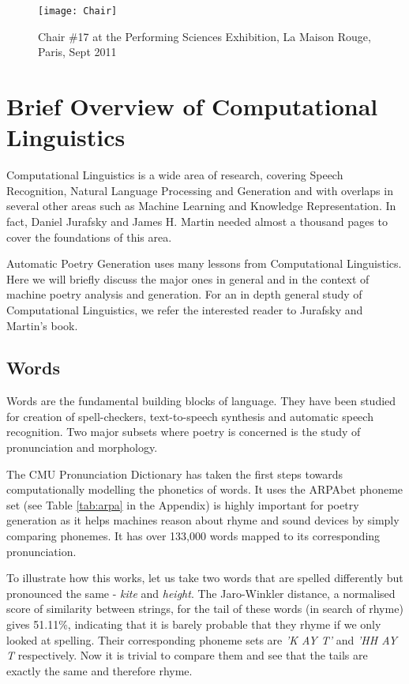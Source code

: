 \begin{figure}[h!]
\centering
\texttt{[image: Chair]}
\caption{Chair \#17 at the Performing Sciences Exhibition, La Maison Rouge, Paris, Sept 2011}
\label{fig:chair}
\end{figure}

\section{Brief Overview of Computational Linguistics}
Computational Linguistics is a wide area of research, covering Speech Recognition, Natural Language Processing and Generation and with overlaps in several other areas such as Machine Learning and Knowledge Representation. In fact, Daniel Jurafsky and James H. Martin needed almost a thousand pages to cover the foundations of this area\cite{jurafsky2000speech}.

Automatic Poetry Generation uses many lessons from Computational Linguistics. Here we will briefly discuss the major ones in general and in the context of machine poetry analysis and generation. For an in depth general study of Computational Linguistics, we refer the interested reader to Jurafsky and Martin's book.

\subsection{Words}
Words are the fundamental building blocks of language. They have been studied for creation of spell-checkers, text-to-speech synthesis and automatic speech recognition. Two major subsets where poetry is concerned is the study of pronunciation and morphology. 

The CMU Pronunciation Dictionary\cite{weide1998cmu} has taken the first steps towards computationally modelling the phonetics of words. It uses the ARPAbet phoneme set (see Table \ref{tab:arpa} in the Appendix) is highly important for poetry generation as it helps machines reason about rhyme and sound devices by simply comparing phonemes. It has over 133,000 words mapped to its corresponding pronunciation.

To illustrate how this works, let us take two words that are spelled differently but pronounced the same - \textit{kite} and \textit{height}. The Jaro-Winkler distance, a normalised score of similarity between strings, for the tail of these words (in search of rhyme) gives 51.11\%, indicating that it is barely probable that they rhyme if we only looked at spelling. Their corresponding phoneme sets are \textit{'K AY T'} and \textit{'HH AY T} respectively. Now it is trivial to compare them and see that the tails are exactly the same and therefore rhyme.

